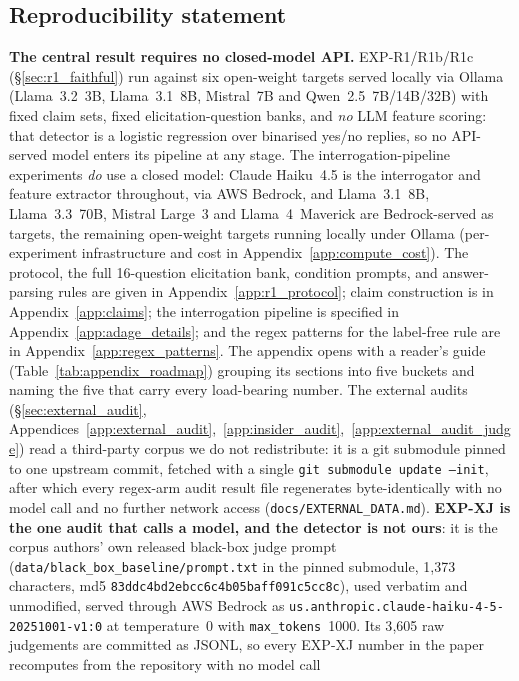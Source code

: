 \documentclass{article} %
\begin{document}
\subsection*{Reproducibility statement}
\textbf{The central result requires no closed-model API.} EXP-R1/R1b/R1c
(§\ref{sec:r1_faithful}) run against six open-weight targets served locally via
Ollama (Llama~3.2~3B, Llama~3.1~8B, Mistral~7B and Qwen~2.5~7B/14B/32B) with
fixed claim sets, fixed elicitation-question banks, and \emph{no} LLM feature
scoring: that detector is a logistic regression over binarised yes/no replies,
so no API-served model enters its pipeline at any stage.
The interrogation-pipeline experiments \emph{do} use a closed model: Claude
Haiku~4.5 is the interrogator and feature extractor throughout, via AWS
Bedrock, and Llama~3.1~8B, Llama~3.3~70B, Mistral Large~3 and Llama~4~Maverick
are Bedrock-served as targets, the remaining open-weight targets running locally
under Ollama (per-experiment infrastructure and cost in
Appendix~\ref{app:compute_cost}).
The protocol, the full 16-question elicitation bank, condition prompts, and
answer-parsing rules are given in Appendix~\ref{app:r1_protocol}; claim
construction is in Appendix~\ref{app:claims}; the interrogation pipeline is
specified in Appendix~\ref{app:adage_details}; and the regex patterns for the
label-free rule are in Appendix~\ref{app:regex_patterns}. The appendix opens with a
reader's guide (Table~\ref{tab:appendix_roadmap}) grouping its sections into five
buckets and naming the five that carry every load-bearing number. The external audits (§\ref{sec:external_audit},
Appendices~\ref{app:external_audit},~\ref{app:insider_audit},~\ref{app:external_audit_judge})
read a third-party corpus we do not redistribute: it is a git submodule pinned to
one upstream commit, fetched with a single \texttt{git submodule update --init},
after which every regex-arm audit result file regenerates byte-identically with no
model call and no further network access (\texttt{docs/EXTERNAL\_DATA.md}).
\textbf{EXP-XJ is the one audit that calls a model, and the detector is not ours}:
it is the corpus authors' own released black-box judge prompt
(\texttt{data/black\_box\_baseline/prompt.txt} in the pinned submodule, 1{,}373
characters, md5 \texttt{83ddc4bd2ebcc6c4b05baff091c5cc8c}), used verbatim and
unmodified, served through AWS Bedrock as
\texttt{us.anthropic.claude-haiku-4-5-20251001-v1:0} at temperature~0 with
\texttt{max\_tokens}~1000. Its 3{,}605 raw judgements are committed as JSONL, so
every EXP-XJ number in the paper recomputes from the repository with no model call
\end{document}
